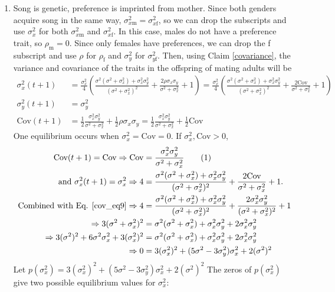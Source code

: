 \documentclass{article}
\newcommand{\x}[1]{\text{#1}}
\newcommand{\Cov}{\text{Cov}}
\newcommand\numberthis{\addtocounter{equation}{1}\tag{\theequation}}
\begin{document}
\begin{enumerate}
\item Song is genetic, preference is imprinted from mother. Since both genders acquire song in the same way, $\sigma_{x\x{m}}^2=\sigma_{x\x{f}}^2$, so we can drop the subscripts and use $\sigma_x^2$ for both $\sigma_{x\x{m}}^2$ and $\sigma_{x\x{f}}^2$. In this case, males do not have a preference trait, so $\rho_\x{m}=0$. Since only females have preferences, we can drop the f subscript and use $\rho$ for $\rho_\x{f}$ and $\sigma_y^2$ for $\sigma_{y\x{f}}^2$. Then, using Claim \ref{covariance}, the variance and covariance of the traits in the offspring of mating adults will be
\begin{align}
\sigma_x^2(t+1)&=\frac{\sigma_x^2}{4}\left(\frac{\sigma^2(\sigma^2+\sigma_x^2)+\sigma_x^2\sigma_y^2}{(\sigma^2+\sigma_x^2)^2}+\frac{2\rho\sigma_x\sigma_y}{\sigma^2+\sigma_x^2}+1\right)=\frac{\sigma_x^2}{4}\left(\frac{\sigma^2(\sigma^2+\sigma_x^2)+\sigma_x^2\sigma_y^2}{(\sigma^2+\sigma_x^2)^2}+\frac{2\Cov }{\sigma^2+\sigma_x^2}+1\right) \label{sigmax9}
\\ \sigma_y^2(t+1)&=\sigma_y^2
\\ \Cov (t+1)&=\frac{1}{2}\frac{\sigma_x^2\sigma_y^2}{\sigma^2+\sigma_x^2}+\frac{1}{2}\rho\sigma_x\sigma_y=\frac{1}{2}\frac{\sigma_x^2\sigma_y^2}{\sigma^2+\sigma_x^2}+\frac{1}{2}\Cov  \label{cov9}
\end{align}
One equilibrium occurs when $\sigma_x^2=\Cov=0$. If $\sigma_x^2,\Cov>0$, 
\begin{align*}
\Cov (t+1)=\Cov \Rightarrow \Cov& =\frac{\sigma_x^2\sigma_y^2}{\sigma^2+\sigma_x^2} \numberthis \label{cov_eq9}
\\ \text{ and } \sigma_x^2(t+1)=\sigma_x^2\Rightarrow 4&=\frac{\sigma^2(\sigma^2+\sigma_x^2)+\sigma_x^2\sigma_y^2}{(\sigma^2+\sigma_x^2)^2}+\frac{2\Cov }{\sigma^2+\sigma_x^2}+1.
\\ \text{Combined with Eq. \ref{cov_eq9}} \Rightarrow 4&=\frac{\sigma^2(\sigma^2+\sigma_x^2)+\sigma_x^2\sigma_y^2}{(\sigma^2+\sigma_x^2)^2}+\frac{2\sigma_x^2\sigma_y^2}{(\sigma^2+\sigma_x^2)^2}+1
\\\Rightarrow 3(\sigma^2+\sigma_x^2)^2&=\sigma^2(\sigma^2+\sigma_x^2)+\sigma_x^2\sigma_y^2+2\sigma_x^2\sigma_y^2
\\\Rightarrow 3(\sigma^2)^2+6\sigma^2\sigma_x^2+3(\sigma_x^2)^2&=\sigma^2(\sigma^2+\sigma_x^2)+\sigma_x^2\sigma_y^2+2\sigma_x^2\sigma_y^2
\\ \Rightarrow 0&=3(\sigma_x^2)^2+(5\sigma^2-3\sigma_y^2)\sigma_x^2+2(\sigma^2)^2
\end{align*}
Let $p(\sigma_x^2)=3(\sigma_x^2)^2+(5\sigma^2-3\sigma_y^2)\sigma_x^2+2(\sigma^2)^2$ The zeros of $p(\sigma_x^2)$ give two possible equilibrium values for $\sigma_x^2$:

\end{enumerate}
\end{document}
